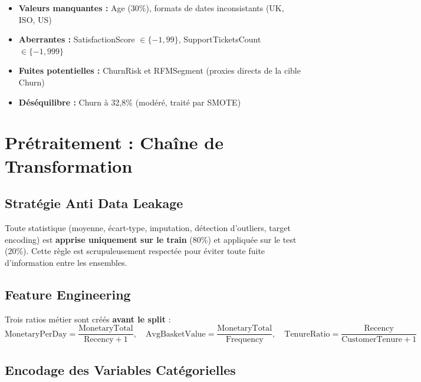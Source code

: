 \documentclass[11pt,a4paper]{article}
\begin{document}
\begin{tcolorbox}[colframe=warningred, title=Défis de qualité]
\begin{itemize}
    \item \textbf{Valeurs manquantes :} Age (30\%), formats de dates inconsistants (UK, ISO, US)
    \item \textbf{Aberrantes :} SatisfactionScore $\in \{-1, 99\}$, SupportTicketsCount $\in \{-1, 999\}$
    \item \textbf{Fuites potentielles :} ChurnRisk et RFMSegment (proxies directs de la cible Churn)
    \item \textbf{Déséquilibre :} Churn à 32,8\% (modéré, traité par SMOTE)
\end{itemize}
\end{tcolorbox}

\section{Prétraitement : Chaîne de Transformation}

\subsection{Stratégie Anti Data Leakage}

Toute statistique (moyenne, écart-type, imputation, détection d'outliers, target encoding) est \textbf{apprise uniquement sur le train} (80\%) et appliquée sur le test (20\%). Cette règle est scrupuleusement respectée pour éviter toute fuite d'information entre les ensembles.

\subsection{Feature Engineering}

Trois ratios métier sont créés \textbf{avant le split} :
$$\text{MonetaryPerDay} = \frac{\text{MonetaryTotal}}{\text{Recency} + 1}, \quad \text{AvgBasketValue} = \frac{\text{MonetaryTotal}}{\text{Frequency}}, \quad \text{TenureRatio} = \frac{\text{Recency}}{\text{CustomerTenure} + 1}$$

\subsection{Encodage des Variables Catégorielles}
\end{document}
